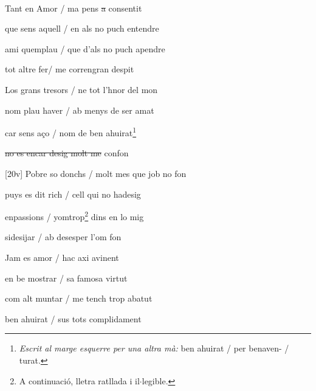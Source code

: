 \documentclass[12pt]{article}
\renewcommand{\espaiAbansEtiquetaPoema}{\vspace{0ex}}
\begin{document}
\begin{estrofa}

\espaiAbansEtiquetaPoema

\\

\end{estrofa}


\begin{estrofa}

 Tant en Amor / ma pens \sout{a}  consentit

 que sens aquell / en als no puch entendre

 ami quemplau / que d'als no puch apendre

 tot altre fer/ me correngran despit

 Los grans tresors / ne tot l'hnor del mon

 nom plau haver / ab menys de ser amat

 car sens a\c{c}o / nom de ben ahuirat\footnote{\textit{Escrit al marge esquerre
per una altra m\`{a}: }ben ahuirat / per benaven- / turat.}

 \sout{no es encar desig molt me}  
confon

\end{estrofa}



\begin{estrofa}

 [20v] Pobre so donchs / molt mes que job no fon

 puys es dit rich / cell qui no hadesig

 enpassions / yomtrop\footnote{A continuaci\'{o}, lletra ratllada i
il$\cdot{}$legible.} dins en lo mig

 sidesijar / ab desesper l'om fon

 Jam es amor / hac axi avinent

 en be mostrar / sa famosa virtut

 com alt muntar / me tench trop abatut

 ben ahuirat / sus tots complidament

\end{estrofa}
\end{document}
